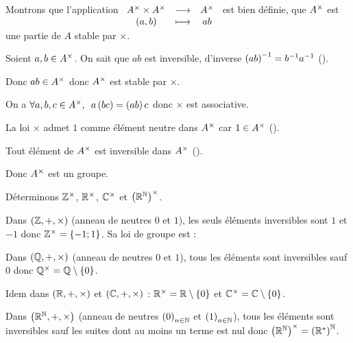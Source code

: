 \begin{dem}
Montrons que l'application \(\begin{array}[t]{ccc}A^{\times}\times A^{\times} & \longrightarrow & A^{\times} \\ \left(a,b\right) & \longmapsto & ab\end{array}\) est bien définie, \cad que \(A^{\times}\) est une partie de \(A\) stable par \(\times\).

Soient \(a,b\in A^{\times}\). On sait que \(ab\) est inversible, d'inverse \(\left(ab\right)^{-1}=b^{-1} a^{-1}\) (\cf {}).

Donc \(ab\in A^{\times}\) donc \(A^{\times}\) est stable par \(\times\).

On a \(\quantifs{\forall a,b,c\in A\croix}a\paren{bc}=\paren{ab}c\) donc \(\times\) est associative.

La loi \(\times\) admet \(1\) comme élément neutre dans \(A^{\times}\) car \(1\in A^{\times}\) (\cf {}).

Tout élément de \(A^{\times}\) est inversible dans \(A^{\times}\) (\cf {}).

Donc \(A^{\times}\) est un groupe.
\end{dem}

\begin{ex}
Déterminons \(\mathbb{Z}^{\times}\), \(\mathbb{R}^{\times}\), \(\mathbb{C}^{\times}\) et \(\left(\mathbb{R}^{\mathbb{N}}\right)^{\times}\).

Dans \(\anneau{\Z}\) (anneau de neutres \(0\) et \(1\)), les seuls éléments inversibles sont \(1\) et \(-1\) donc \(\mathbb{Z}^{\times}=\left\lbrace-1;1\right\rbrace\). Sa loi de groupe est :

\begin{center}
\end{center}

Dans \(\anneau{\Q}\) (anneau de neutres \(0\) et \(1\)), tous les éléments sont inversibles sauf \(0\) donc \(\mathbb{Q}^{\times}=\mathbb{Q}\setminus\left\lbrace0\right\rbrace\).

Idem dans \(\anneau{\R}\) et \(\anneau{\C}\) : \(\mathbb{R}^{\times}=\mathbb{R}\setminus\left\lbrace0\right\rbrace\) et \(\mathbb{C}^{\times}=\mathbb{C}\setminus\left\lbrace0\right\rbrace\).

Dans \(\anneau{\R^\N}\) (anneau de neutres \(\left(0\right)_{n\in\mathbb{N}}\) et \(\left(1\right)_{n\in\mathbb{N}}\)), tous les éléments sont inversibles sauf les suites dont au moins un terme est nul donc \(\left(\mathbb{R}^{\mathbb{N}}\right)^{\times}=\left(\mathbb{R}^*\right)^{\mathbb{N}}\).
\end{ex}

